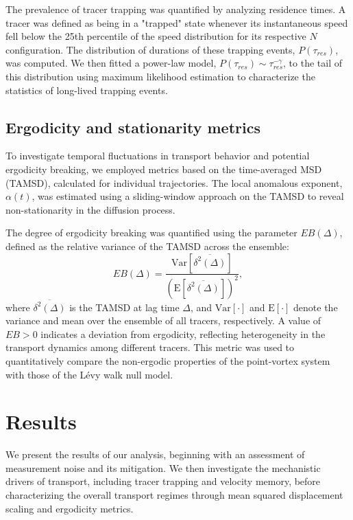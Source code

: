 \documentclass[]{article}
\begin{document}
The prevalence of tracer trapping was quantified by analyzing residence times. A tracer was defined as being in a "trapped" state whenever its instantaneous speed fell below the 25th percentile of the speed distribution for its respective $N$ configuration. The distribution of durations of these trapping events, $P(\tau_{res})$, was computed. We then fitted a power-law model, $P(\tau_{res}) \sim \tau_{res}^{-\gamma}$, to the tail of this distribution using maximum likelihood estimation to characterize the statistics of long-lived trapping events.

\subsection{Ergodicity and stationarity metrics}

To investigate temporal fluctuations in transport behavior and potential ergodicity breaking, we employed metrics based on the time-averaged MSD (TAMSD), calculated for individual trajectories. The local anomalous exponent, $\alpha(t)$, was estimated using a sliding-window approach on the TAMSD to reveal non-stationarity in the diffusion process.

The degree of ergodicity breaking was quantified using the parameter $EB(\Delta)$, defined as the relative variance of the TAMSD across the ensemble:
\begin{equation}
EB(\Delta) = \frac{\text{Var}[\overline{\delta^2(\Delta)}]}{(\text{E}[\overline{\delta^2(\Delta)}])^2},
\end{equation}
where $\overline{\delta^2(\Delta)}$ is the TAMSD at lag time $\Delta$, and $\text{Var}[\cdot]$ and $\text{E}[\cdot]$ denote the variance and mean over the ensemble of all tracers, respectively. A value of $EB > 0$ indicates a deviation from ergodicity, reflecting heterogeneity in the transport dynamics among different tracers. This metric was used to quantitatively compare the non-ergodic properties of the point-vortex system with those of the L\'evy walk null model.

\section{Results}
\label{sec:results}
We present the results of our analysis, beginning with an assessment of measurement noise and its mitigation. We then investigate the mechanistic drivers of transport, including tracer trapping and velocity memory, before characterizing the overall transport regimes through mean squared displacement scaling and ergodicity metrics.
\end{document}

